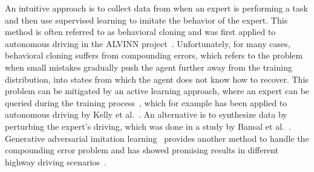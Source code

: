 An intuitive approach is to collect data from when an expert is performing a task and then use supervised learning to imitate the behavior of the expert. This method is often referred to as behavioral cloning and was first applied to autonomous driving in the ALVINN project~\cite{Pomerleau1989}. Unfortunately, for many cases, behavioral cloning suffers from compounding errors, which refers to the problem when small mistakes gradually push the agent further away from the training distribution, into states from which the agent does not know how to recover. This problem can be mitigated by an active learning approach, where an expert can be queried during the training process~\cite{Ross2011}, which for example has been applied to autonomous driving by Kelly et al.~\cite{Kelly2019}. An alternative is to synthesize data by perturbing the expert's driving, which was done in a study by Bansal et al.~\cite{Bansal2019}. Generative adversarial imitation learning~\cite{Ho2016} provides another method to handle the compounding error problem and has showed promising results in different highway driving scenarios~\cite{Kuefler2017}.

